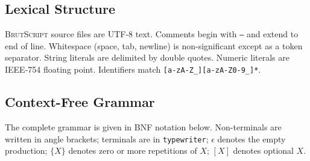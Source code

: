 \documentclass[10pt,twocolumn,a4paper]{article}
\theoremstyle{definition}
\theoremstyle{remark}
\newcommand{\BS}{\textsc{BrutScript}}
\begin{document}
\subsection{Lexical Structure}

\BS{} source files are UTF-8 text.  Comments begin with \texttt{--} and
extend to end of line.  Whitespace (space, tab, newline) is
non-significant except as a token separator.  String literals are
delimited by double quotes.  Numeric literals are IEEE-754 floating
point.  Identifiers match \texttt{[a-zA-Z\_][a-zA-Z0-9\_\.]*}.

\subsection{Context-Free Grammar}

The complete grammar is given in BNF notation below.  Non-terminals
are written in angle brackets; terminals are in \texttt{typewriter};
$\epsilon$ denotes the empty production; $\{X\}$ denotes zero or more
repetitions of $X$; $[X]$ denotes optional $X$.
\end{document}
